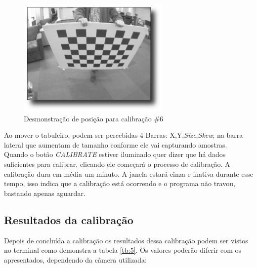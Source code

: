 \begin{figure}[!htb]
  \includegraphics[width=\linewidth]{Imagens/figura3-19.png}
  \caption{Desmonstração de posição para calibração \#6}\label{fig3:19}
\endminipage
\end{figure}

Ao mover o tabuleiro, podem ser percebidas 4 Barras: X,Y,\textit{Size},\textit{Skew}; na barra lateral que aumentam de tamanho conforme ele vai capturando amostras. Quando o botão \textit{CALIBRATE} estiver iluminado quer dizer que há dados suficientes para calibrar, clicando ele começará o processo de calibração.
A calibração dura em média um minuto. A janela estará cinza e inativa durante esse tempo, isso indica que a calibração está ocorrendo e o programa não travou, bastando apenas aguardar.

\subsection{Resultados da calibração}

Depois de concluída a calibração os resultados dessa calibração podem ser vistos no terminal como demonstra a tabela \ref{tb:5}. Os valores poderão diferir com os apresentados, dependendo da câmera utilizada:


